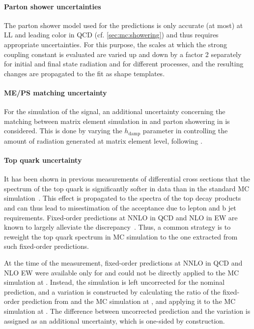 \paragraph{Parton shower uncertainties}

The parton shower model used for the predictions is only accurate (at most) at LL and leading color in QCD (cf. \cref{sec:mc:showering}) and thus requires appropriate uncertainties. For this purpose, the scales at which the strong coupling constant is evaluated are varied up and down by a factor 2 separately for initial and final state radiation and for different processes, and the resulting changes are propagated to the fit as shape templates.

\paragraph{ME/PS matching uncertainty}

For the simulation of the \ttbar signal, an additional uncertainty concerning the matching between matrix element simulation in \powheg and parton showering in \pythia is considered. This is done by varying the $h_{\mathrm{damp}}$ parameter in \powheg controlling the amount of radiation generated at matrix element level, following .

\paragraph{Top quark \pt uncertainty}

It has been shown in previous measurements of \ttbar differential cross sections that the \pt spectrum of the top quark is significantly softer in data than in the standard \powheg MC simulation~\cite{CMS:TOP-17-014,CMS:TOP-16-007,CMS:TOP-16-008}. This effect is propagated to the \pt spectra of the top decay products and can thus lead to misestimation of the acceptance due to lepton and b jet \pt requirements. Fixed-order predictions at NNLO in QCD and NLO in EW are known to largely alleviate the discrepancy~\cite{Czakon:2017wor}. Thus, a common strategy is to reweight the top quark \pt spectrum in MC simulation to the one extracted from such fixed-order predictions.

At the time of the measurement, fixed-order predictions at NNLO in QCD and NLO EW were available only for \sqrtsRII and could not be directly applied to the MC simulation at \sqrtsRIII. Instead, the simulation is left uncorrected for the nominal prediction, and a variation is constructed by calculating the ratio of the fixed-order prediction from  and the \powheg MC simulation at \sqrtsRII, and applying it to the \powheg MC simulation at \sqrtsRIII. The difference between uncorrected prediction and the variation is assigned as an additional uncertainty, which is one-sided by construction.

